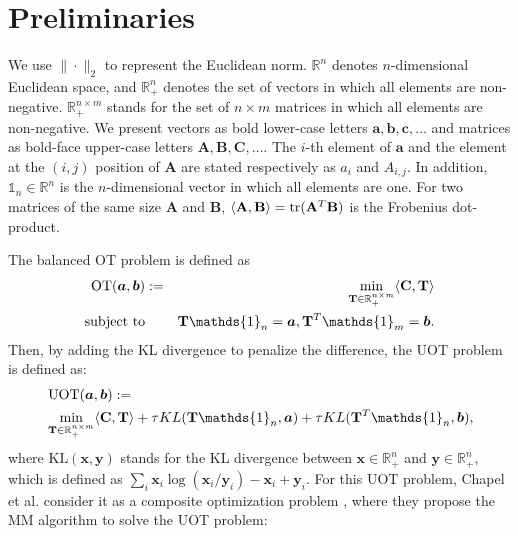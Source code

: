 \documentclass[a4paper,twocolumn]{article}
\newcommand{\R}{\mathbb{R}}
\newcommand{\one}{\mathds{1}}
\newcommand{\mat}[1]{\mathbf{#1}}
\renewcommand{\vec}[1]{\bm{#1}}
\begin{document}
\section{Preliminaries}
We use $\| \cdot \|_2$ to represent the Euclidean norm. $\mathbb{R}^n$ denotes $n$-dimensional Euclidean space, and $\mathbb{R}^n_+$ denotes the set of vectors in which all elements are non-negative. $\mathbb{R}^{n \times m}_+$ stands for the set of $n \times m$ matrices in which all elements are non-negative. We present vectors as bold lower-case letters $\vec{a},\vec{b},\vec{c},\dots$ and matrices as bold-face upper-case letters $\mat{A},\mat{B},\mat{C},\dots$. The $i$-th element of $\vec{a}$ and the element at the $(i,j)$ position of $\mat{A}$ are stated respectively as $a_i$ and ${A}_{i,j}$. In addition, $\one_n \in \mathbb{R}^n$ is the $n$-dimensional vector in which all elements are one.
For two matrices of the same size $\mat{A}$ and $\mat{B}$, $\langle \mat{A},\mat{B}\rangle={\rm tr}(\mat{A}^T\mat{B})$ is the Frobenius dot-product. 

The balanced OT problem is defined as
\begin{eqnarray}
\label{Eq:Standard_OT}
\operatorname{OT}(\vec{a},\vec{b}) &:=& \min_{ \mat{T} \in \R_{+}^{n \times m}} \langle \mat{C}, \mat{T} \rangle \\
\text{subject\ to}&& \mat{T} \one_n= \vec{a}, \mat{T}^{T}\one_m = \vec{b}. \notag
\end{eqnarray}
Then, by adding the KL divergence to penalize the difference, the UOT problem is defined as:
\begin{align}
\label{eq:uot}
&\operatorname{UOT}(\vec{a},\vec{b}) := \notag\\
&\min_{\mat{T} \in \R_{+}^{n \times m}} \langle \mat{C}, \mat{T} \rangle+ \tau KL(\mat{T} \one_n,\vec{a}) + \tau KL(\mat{T}^{T} \one_n,\vec{b}),
\end{align}
where $\mathrm{KL}(\vec{x},\vec{y})$ stands for the KL divergence between $\vec{x} \in \mathbb{R}_+^n$ and $\vec{y} \in \mathbb{R}_+^n$, which is defined as $\sum_i \vec{x}_i \log {(\vec{x}_i/\vec{y}_i)} - \vec{x}_i + \vec{y}_i$. For this UOT problem, Chapel et al. consider it as a composite optimization problem \cite{Chapel_NeurIPS_2021}, where they propose the MM algorithm to solve the UOT problem:
\end{document}
